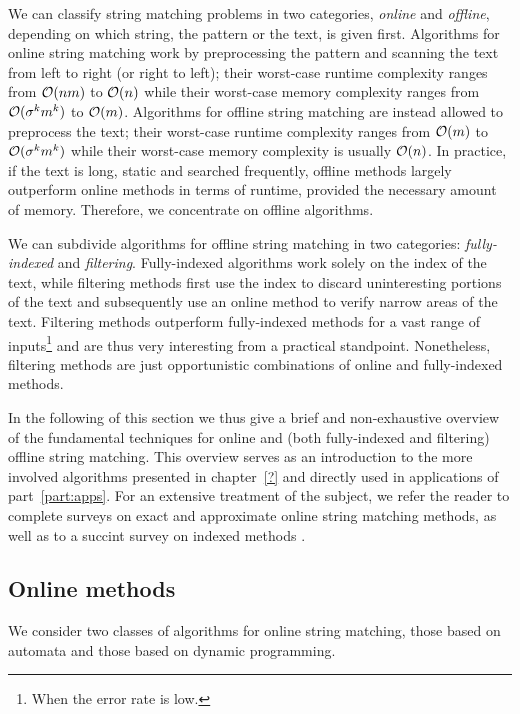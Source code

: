 We can classify string matching problems in two categories, \emph{online} and \emph{offline}, depending on which string, the pattern or the text, is given first.
Algorithms for online string matching work by preprocessing the pattern and scanning the text from left to right (or right to left); their worst-case runtime complexity ranges from $\mathcal{O}(nm)$ to $\mathcal{O}(n)$ while their worst-case memory complexity ranges from $\mathcal{O}(\sigma^k m^k)$ to $\mathcal{O}(m)$.
Algorithms for offline string matching are instead allowed to preprocess the text; their worst-case runtime complexity ranges from $\mathcal{O}(m)$ to $\mathcal{O}(\sigma^k m^k)$ while their worst-case memory complexity is usually $\mathcal{O}(n)$.
In practice, if the text is long, static and searched frequently, offline methods largely outperform online methods in terms of runtime, provided the necessary amount of memory. Therefore, we concentrate on offline algorithms.

We can subdivide algorithms for offline string matching in two categories: \emph{fully-indexed} and \emph{filtering}.
Fully-indexed algorithms work solely on the index of the text, while filtering methods first use the index to discard uninteresting portions of the text and subsequently use an online method to verify narrow areas of the text.
Filtering methods outperform fully-indexed methods for a vast range of inputs\footnote{When the error rate is low.} and are thus very interesting from a practical standpoint. Nonetheless, filtering methods are just opportunistic combinations of online and fully-indexed methods.

In the following of this section we thus give a brief and non-exhaustive overview of the fundamental techniques for online and (both fully-indexed and filtering) offline string matching.
This overview serves as an introduction to the more involved algorithms presented in chapter~\ref{?} and directly used in applications of part~\ref{part:apps}.
For an extensive treatment of the subject, we refer the reader to complete surveys on exact \citep{Faro2013} and approximate \citep{Navarro1999} online string matching methods, as well as to a succint survey on indexed methods \citep{Navarro2001}.


\subsection{Online methods}

We consider two classes of algorithms for online string matching, those based on automata and those based on dynamic programming.

